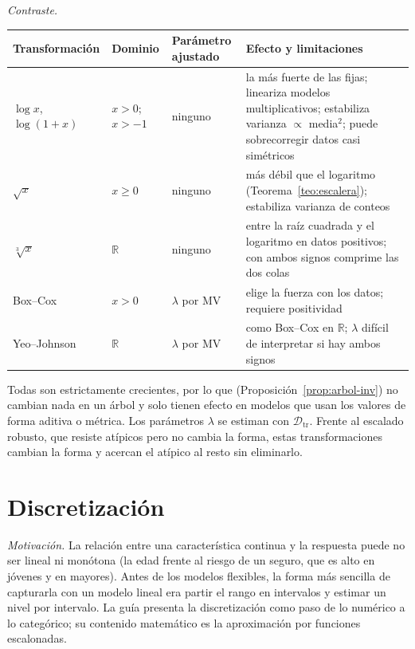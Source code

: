 \documentclass[11pt]{article}
\theoremstyle{definition}
\theoremstyle{remark}
\newcommand{\R}{\mathbb{R}}
\newcommand{\Dtr}{\mathcal{D}_{\mathrm{tr}}}
\begin{document}
\medskip

\noindent \emph{Contraste.}
\begin{center}
\begin{tabularx}{\linewidth}{@{}lYYY@{}}
\toprule
Transformación & Dominio & Parámetro ajustado & Efecto y limitaciones\\
\midrule
$\log x$, $\log(1+x)$ & $x>0$; $x>-1$ & ninguno & la más fuerte de las fijas; lineariza modelos multiplicativos; estabiliza varianza $\propto$ media$^2$; puede sobrecorregir datos casi simétricos\\
$\sqrt x$ & $x\ge0$ & ninguno & más débil que el logaritmo (Teorema~\ref{teo:escalera}); estabiliza varianza de conteos\\
$\sqrt[3]x$ & $\R$ & ninguno & entre la raíz cuadrada y el logaritmo en datos positivos; con ambos signos comprime las dos colas\\
Box--Cox & $x>0$ & $\lambda$ por MV & elige la fuerza con los datos; requiere positividad\\
Yeo--Johnson & $\R$ & $\lambda$ por MV & como Box--Cox en $\R$; $\lambda$ difícil de interpretar si hay ambos signos\\
\bottomrule
\end{tabularx}
\end{center}

\noindent Todas son estrictamente crecientes, por lo que (Proposición~\ref{prop:arbol-inv}) no cambian nada en un árbol y solo tienen efecto en modelos que usan los valores de forma aditiva o métrica. Los parámetros $\lambda$ se estiman con $\Dtr$. Frente al escalado robusto, que resiste atípicos pero no cambia la forma, estas transformaciones cambian la forma y acercan el atípico al resto sin eliminarlo.

\section{Discretización}\label{sec:binning}

\noindent \emph{Motivación.} La relación entre una característica continua y la respuesta puede no ser lineal ni monótona (la edad frente al riesgo de un seguro, que es alto en jóvenes y en mayores). Antes de los modelos flexibles, la forma más sencilla de capturarla con un modelo lineal era partir el rango en intervalos y estimar un nivel por intervalo. La guía presenta la discretización como paso de lo numérico a lo categórico; su contenido matemático es la aproximación por funciones escalonadas.
\end{document}
